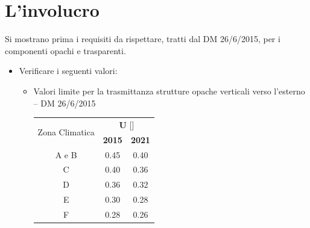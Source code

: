 \section{L'involucro}
Si mostrano prima i requisiti da rispettare, tratti dal DM 26/6/2015, per i componenti opachi e trasparenti.
\begin{itemize}
	\item Verificare i seguenti valori:
\begin{itemize}
\item Valori limite per la trasmittanza strutture opache verticali verso l'esterno -- DM 26/6/2015
\begin{center}
	\begin{tabular}{ccc}
	\multirow{2}{*}{Zona Climatica} & \multicolumn{2}{c}{\textbf{U} [\trasm]}	\\
	\cmidrule(lr){2-3}
	& \textbf{2015} & \textbf{2021}				\\
	\midrule
	A e B							&	0.45		&	0.40 					\\
	C								& 	0.40		&	0.36					\\
	D								&	0.36		&	0.32					\\
	E								&	0.30		&	0.28					\\
	F								&	0.28		&	0.26					\\
\end{tabular}
\end{center}


\end{itemize}
\end{itemize}
